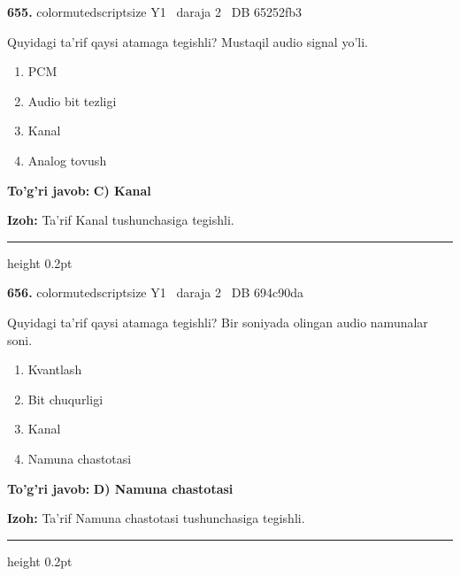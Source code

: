 \documentclass[10pt,a4paper,oneside]{article}
\begin{document}
\noindent\textbf{\color{ink}655.}  {color{muted}scriptsize Y1 \textbullet\ daraja 2 \textbullet\ DB 65252fb3}
\par
Quyidagi ta'rif qaysi atamaga tegishli? Mustaqil audio signal yo'li.
\begin{enumerate}[label=\Alph*),leftmargin=9mm]
\item PCM
\item Audio bit tezligi
\item Kanal
\item Analog tovush
\end{enumerate}
\begin{tcolorbox}[enhanced,breakable,colback=teal!4,colframe=teal!50!black,boxrule=0.5pt,arc=1.1mm,left=3mm,right=3mm,top=1.7mm,bottom=1.7mm,before skip=2mm,after skip=2mm]
\textbf{\color{teal}To'g'ri javob:} \textbf{C) Kanal}
\par\smallskip
\textbf{Izoh:} Ta'rif Kanal tushunchasiga tegishli.
\end{tcolorbox}
\vspace{2mm}\hrule height 0.2pt \vspace{3mm}

\noindent\textbf{\color{ink}656.}  {color{muted}scriptsize Y1 \textbullet\ daraja 2 \textbullet\ DB 694c90da}
\par
Quyidagi ta'rif qaysi atamaga tegishli? Bir soniyada olingan audio namunalar soni.
\begin{enumerate}[label=\Alph*),leftmargin=9mm]
\item Kvantlash
\item Bit chuqurligi
\item Kanal
\item Namuna chastotasi
\end{enumerate}
\begin{tcolorbox}[enhanced,breakable,colback=teal!4,colframe=teal!50!black,boxrule=0.5pt,arc=1.1mm,left=3mm,right=3mm,top=1.7mm,bottom=1.7mm,before skip=2mm,after skip=2mm]
\textbf{\color{teal}To'g'ri javob:} \textbf{D) Namuna chastotasi}
\par\smallskip
\textbf{Izoh:} Ta'rif Namuna chastotasi tushunchasiga tegishli.
\end{tcolorbox}
\vspace{2mm}\hrule height 0.2pt \vspace{3mm}
\end{document}
